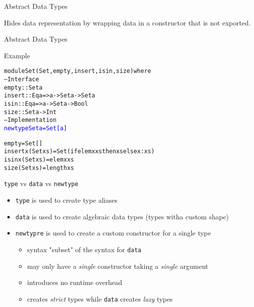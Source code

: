 \documentclass{beamer}
\def\code#1{\texttt{\frenchspacing#1}}
\begin{document}
\begin{frame}{Abstract Data Types}

\begin{block}{\centering Hides data representation by wrapping data in a constructor that is not exported.}
\end{block}

\end{frame}

\begin{frame}[fragile]{Abstract Data Types}

\begin{exampleblock}{Example}
\begin{alltt}
module Set (Set, empty, insert, isin, size) where
-- Interface
empty :: Set a
insert :: Eq a => a -> Set a -> Set a
isin :: Eq a => a -> Set a -> Bool
size :: Set a -> Int\pause
-- Implementation
\textcolor{blue}{newtype Set a = Set [a]}\pause

empty = Set []\pause
insert x (Set xs) = Set (if elem x xs then xs else x:xs)\pause
isin x (Set xs) = elem x xs\pause
size (Set xs) = length xs
\end{alltt}
\end{exampleblock}

\end{frame}

\begin{frame}{\code{type} vs \code{data} vs \code{newtype}}

\begin{itemize}
    \item \code{type} is used to create type aliases\pause
    \item \code{data} is used to create algebraic data types (types witha custom shape)\pause
    \item \code{newtypre} is used to create a custom constructor for a single type\pause
        \begin{itemize}
            \item syntax "subset" of the syntax for \code{data}
            \item may only have a \textit{single} constructor taking a \textit{single} argument
            \item introduces no runtime overhead
            \item creates \textit{strict} types while \code{data} creates \textit{lazy} types
        \end{itemize}
\end{itemize}

\end{frame}
\end{document}
